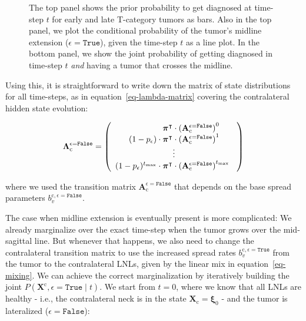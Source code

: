 \documentclass[
  sn-mathphys-num,
]{sn-jnl}
\begin{document}
\begin{figure}


\caption{\label{fig-model-midext-evo}The top panel shows the prior
probability to get diagnosed at time-step \(t\) for early and late
T-category tumors as bars. Also in the top panel, we plot the
conditional probability of the tumor's midline extension
(\(\epsilon=\texttt{True}\)), given the time-step \(t\) as a line plot.
In the bottom panel, we show the joint probability of getting diagnosed
in time-step \(t\) \emph{and} having a tumor that crosses the midline.}

\end{figure}%

Using this, it is straightforward to write down the matrix of state
distributions for all time-steps, as in equation~\ref{eq-lambda-matrix}
covering the contralateral hidden state evolution:

\[
\boldsymbol{\Lambda}_\text{c}^{\epsilon=\texttt{False}} =
\left(
\begin{array}{r}
\boldsymbol{\pi}^\intercal \cdot \left( \mathbf{A}_\text{c}^{\epsilon=\texttt{False}} \right)^{0\phantom{t_\text{max}}} \\
(1-p_\epsilon) \cdot \boldsymbol{\pi}^\intercal \cdot \left( \mathbf{A}_\text{c}^{\epsilon=\texttt{False}} \right)^{1\phantom{t_\text{max}}} \\
\hfill \vdots \hfill \\
(1-p_\epsilon)^{t_\text{max}} \cdot \boldsymbol{\pi}^\intercal \cdot \left( \mathbf{A}_\text{c}^{\epsilon=\texttt{False}} \right)^{t_\text{max}\phantom{0}} \\
\end{array}
\right)
\]

where we used the transition matrix
\(\mathbf{A}_\text{c}^{\epsilon=\texttt{False}}\) that depends on the
base spread parameters \(b_v^{\text{c},\epsilon=\texttt{False}}\).

The case when midline extension is eventually present is more
complicated: We already marginalize over the exact time-step when the
tumor grows over the mid-sagittal line. But whenever that happens, we
also need to change the contralateral transition matrix to use the
increased spread rates \(b_v^{\text{c}, \epsilon=\texttt{True}}\) from
the tumor to the contralateral LNLs, given by the linear mix in
equation~\ref{eq-mixing}. We can achieve the correct marginalization by
iteratively building the joint
\(P \left( \mathbf{X}^\text{c}, \epsilon=\texttt{True} \mid t \right)\).
We start from \(t=0\), where we know that all LNLs are healthy - i.e.,
the contralateral neck is in the state
\(\mathbf{X}_\text{c}=\boldsymbol{\xi}_0\) - and the tumor is
lateralized (\(\epsilon=\texttt{False}\)):
\end{document}
